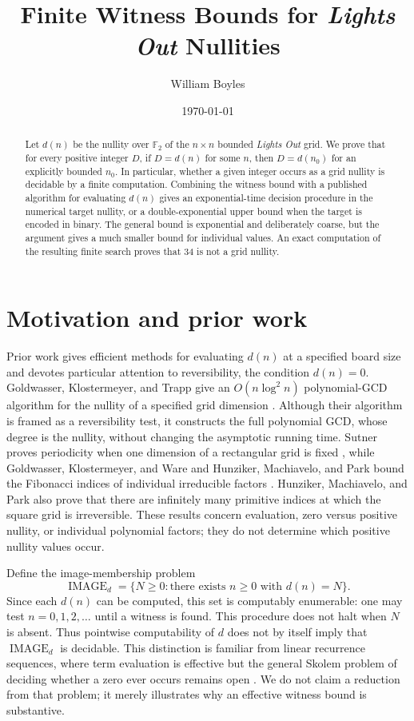 \documentclass[a4paper]{article}
\newcommand{\F}{\mathbb{F}}
\begin{document}
\title{Finite Witness Bounds for \textit{Lights Out} Nullities}
\author{William Boyles}
\date{\today}
\maketitle

\begin{abstract}
	Let $d(n)$ be the nullity over $\F_2$ of the $n\times n$ bounded
	\textit{Lights Out} grid.
	We prove that for every positive integer $D$, if $D=d(n)$ for some
	$n$, then $D=d(n_0)$ for an explicitly bounded $n_0$.
	In particular, whether a given integer occurs as a grid nullity is
	decidable by a finite computation.
	Combining the witness bound with a published algorithm for evaluating
	$d(n)$ gives an exponential-time decision procedure in the numerical
	target nullity, or a double-exponential upper bound when the target is
	encoded in binary.
	The general bound is exponential and deliberately coarse, but the
	argument gives a much smaller bound for individual values.
	An exact computation of the resulting finite search proves that 34 is
	not a grid nullity.
\end{abstract}

\section{Motivation and prior work}

Prior work gives efficient methods for evaluating $d(n)$ at a specified
board size and devotes particular attention to reversibility, the condition
$d(n)=0$.
Goldwasser, Klostermeyer, and Trapp give an
$O(n\log^2 n)$ polynomial-GCD algorithm for the nullity of a specified
grid dimension \cite{GoldwasserKlostermeyerTrapp1997}.
Although their algorithm is framed as a reversibility test, it constructs
the full polynomial GCD, whose degree is the nullity, without changing the
asymptotic running time.
Sutner proves periodicity when one dimension of a rectangular grid is
fixed \cite{Sutner1988}, while Goldwasser, Klostermeyer, and Ware and
Hunziker, Machiavelo, and Park bound the Fibonacci indices of individual
irreducible factors \cite{Goldwasser2002,HUNZIKER2004465}.
Hunziker, Machiavelo, and Park also prove that there are infinitely many
primitive indices at which the square grid is irreversible.
These results concern evaluation, zero versus positive nullity, or
individual polynomial factors; they do not determine which positive
nullity values occur.

Define the image-membership problem
\[
	\operatorname{IMAGE}_d
	=
	\{N\geq0:\text{there exists }n\geq0\text{ with }d(n)=N\}.
\]
Since each $d(n)$ can be computed, this set is computably enumerable:
one may test $n=0,1,2,\ldots$ until a witness is found.
This procedure does not halt when $N$ is absent.
Thus pointwise computability of $d$ does not by itself imply that
$\operatorname{IMAGE}_d$ is decidable.
This distinction is familiar from linear recurrence sequences, where
term evaluation is effective but the general Skolem problem of deciding
whether a zero ever occurs remains open \cite{BiluEtAl2022}.
We do not claim a reduction from that problem; it merely illustrates why
an effective witness bound is substantive.
\end{document}
